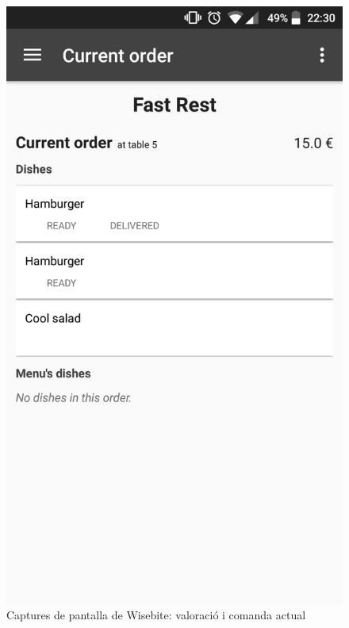 \begin{figure}[!h]
\includegraphics[scale=0.15]{Figures/wisebite_screenshot_8.png}
\caption{Captures de pantalla de Wisebite: valoració i comanda actual}
\end{figure}